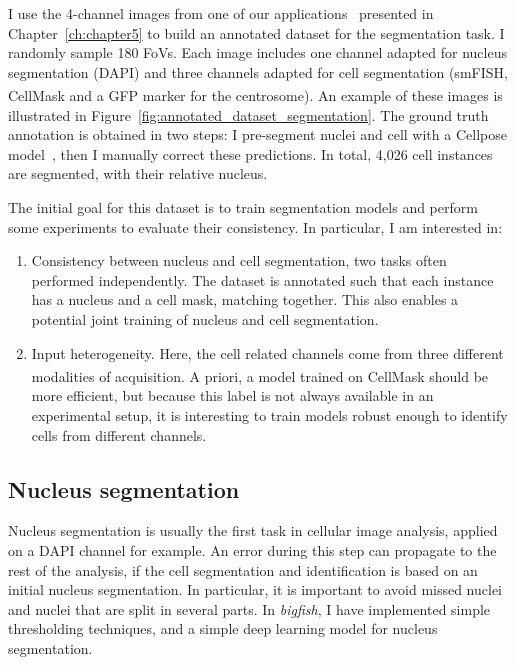 I use the 4-channel images from one of our applications~\cite{safieddine_choreography_2021} presented in Chapter~\ref{ch:chapter5} to build an annotated dataset for the segmentation task.
I randomly sample 180 \ac{FoV}s.
Each image includes one channel adapted for nucleus segmentation (DAPI) and three channels adapted for cell segmentation (\ac{smFISH}, CellMask\textsuperscript{\texttrademark} and a \ac{GFP} marker for the centrosome).
An example of these images is illustrated in Figure~\ref{fig:annotated_dataset_segmentation}.
The ground truth annotation is obtained in two steps: I pre-segment nuclei and cell with a Cellpose model~\cite{stringer_cellpose_2021}, then I manually correct these predictions.
In total, 4,026 cell instances are segmented, with their relative nucleus.

The initial goal for this dataset is to train segmentation models and perform some experiments to evaluate their consistency.
In particular, I am interested in:

\begin{enumerate}
	\setlength\itemsep{0.1em}
	\item Consistency between nucleus and cell segmentation, two tasks often performed independently.
	The dataset is annotated such that each instance has a nucleus and a cell mask, matching together.
	This also enables a potential joint training of nucleus and cell segmentation.
	\item Input heterogeneity.
	Here, the cell related channels come from three different modalities of acquisition.
	A priori, a model trained on CellMask\textsuperscript{\texttrademark} should be more efficient, but because this label is not always available in an experimental setup, it is interesting to train models robust enough to identify cells from different channels.
\end{enumerate}

\subsection{Nucleus segmentation}
\label{subsec:segmentation_nuc}

Nucleus segmentation is usually the first task in cellular image analysis, applied on a DAPI channel for example.
An error during this step can propagate to the rest of the analysis, if the cell segmentation and identification is based on an initial nucleus segmentation.
In particular, it is important to avoid missed nuclei and nuclei that are split in several parts.
In \emph{bigfish}, I have implemented simple thresholding techniques, and a simple deep learning model for nucleus segmentation.

